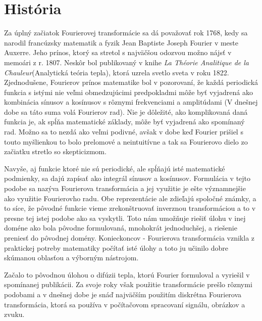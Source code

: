 \section{História}
Za úplný začiatok Fourierovej transformácie sa dá považovať rok 1768,
kedy sa narodil francúzsky matematik a fyzik Jean Baptiste Joseph
Fourier v meste Auxerre. Jeho prínos, ktorý sa stretol s najväčšou
odozvou možno nájsť v memoári z r. 1807. Neskôr bol publikovaný v
knihe \emph{La Théorie Analitique de la Chauleur}(Analytická teória
tepla), ktorá uzrela svetlo sveta v roku 1822.
Zjednodušene, Fourierov prínos matematike bol v pozorovaní, že každá
periodická funkcia s istými nie veľmi obmedzujúcimi predpokladmi
môže byť vyjadrená ako kombinácia sínusov a kosínusov s rôznymi
frekvenciami a amplitúdami (V dnešnej dobe sa táto suma volá Fourierov
rad). Nie je dôležité, ako komplikovaná daná funkcia je, ak spĺňa
matematické základy, môže byť vyjadrená ako spomínaný rad. Možno sa to
nezdá ako veľmi podivné, avšak v dobe keď Fourier prišiel s touto
myšlienkou to bolo prelomové a neintuitívne a tak sa Fourierovo dielo
zo začiatku stretlo so skepticizmom.

Navyše, aj funkcie ktoré nie sú periodické, ale spĺňajú isté
matematické podmienky, sa dajú zapísať ako integrál sínusov a kosínusov.
Formulácia v tejto podobe sa nazýva Fourierova transformácia a jej
využitie je ešte významnejšie ako využitie Fourierovho radu. Obe
reprezentácie ale zdieľajú spoločné známky, a to síce, že pôvodné
funkcie vieme zrekonštruovať inverznou transformáciou a to v presne
tej istej podobe ako sa vyskytli. Toto nám umožňuje riešiť úlohu v
inej doméne ako bola pôvodne formulovaná, mnohokrát jednoduchšej, a
riešenie preniesť do pôvodnej domény. Konieckoncov - Fourierova
transformácia vznikla z praktickej potreby matematiky počítať isté
úlohy a toto ju učinilo dobre skúmanou oblasťou a výborným nástrojom.

Začalo to pôvodnou úlohou o difúzii tepla, ktorú Fourier formuloval a
vyriešil v spomínanej publikácii. Za svoje roky však použitie
transformácie prešlo rôznymi podobami a v dnešnej dobe je snáď
najväčším použitím diskrétna Fourierova transformácia, ktorá sa
používa v počítačovom spracovaní signálu, obrázkov a zvuku.
